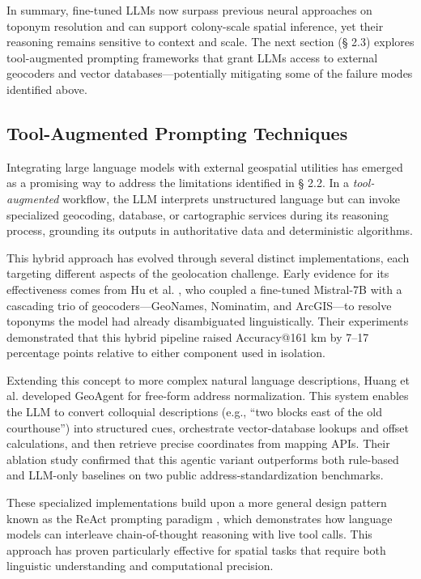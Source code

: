 In summary, fine-tuned LLMs now surpass previous neural approaches on
toponym resolution and can support colony-scale spatial inference, yet
their reasoning remains sensitive to context and scale. The next section
(§ 2.3) explores tool-augmented prompting frameworks that grant LLMs
access to external geocoders and vector databases---potentially
mitigating some of the failure modes identified above.

\subsection{Tool-Augmented Prompting
Techniques}\label{tool-augmented-prompting-techniques}

Integrating large language models with external geospatial utilities has
emerged as a promising way to address the limitations identified in §
2.2. In a \emph{tool-augmented} workflow, the LLM interprets
unstructured language but can invoke specialized geocoding, database, or
cartographic services during its reasoning process, grounding its
outputs in authoritative data and deterministic algorithms.

This hybrid approach has evolved through several distinct
implementations, each targeting different aspects of the geolocation
challenge. Early evidence for its effectiveness comes from Hu et al.
\citep{Hu2024_toponym_llm}, who coupled a fine-tuned Mistral-7B with a
cascading trio of geocoders---GeoNames, Nominatim, and ArcGIS---to
resolve toponyms the model had already disambiguated linguistically.
Their experiments demonstrated that this hybrid pipeline raised
Accuracy@161 km by 7--17 percentage points relative to either component
used in isolation.

Extending this concept to more complex natural language descriptions,
Huang et al. \citep{Huang2024_geoagent} developed GeoAgent for free-form
address normalization. This system enables the LLM to convert colloquial
descriptions (e.g., ``two blocks east of the old courthouse'') into
structured cues, orchestrate vector-database lookups and offset
calculations, and then retrieve precise coordinates from mapping APIs.
Their ablation study confirmed that this agentic variant outperforms
both rule-based and LLM-only baselines on two public
address-standardization benchmarks.

These specialized implementations build upon a more general design
pattern known as the ReAct prompting paradigm \citep{yao2023react},
which demonstrates how language models can interleave chain-of-thought
reasoning with live tool calls. This approach has proven particularly
effective for spatial tasks that require both linguistic understanding
and computational precision.

